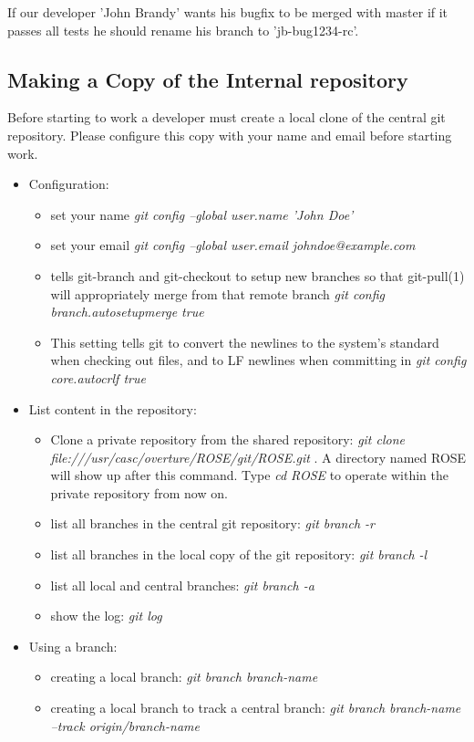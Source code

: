If our developer 'John Brandy' wants his bugfix to be merged with master if it passes
all tests he should rename his branch to 'jb-bug1234-rc'.


\subsection{Making a Copy of the Internal repository}



Before starting to work a developer must create a local clone of the central git repository.
Please configure this copy with your name and email before starting work.

\begin{itemize}

\item Configuration:
  \begin{itemize}
          \item set your name \textit{git config --global user.name 'John Doe' }
	  \item set your email \textit{git config --global user.email johndoe@example.com}
	  \item tells git-branch and git-checkout to setup new branches so that git-pull(1)
    will appropriately merge from that remote branch \textit{git config branch.autosetupmerge true}
          \item This setting tells git to convert the newlines to the system’s standard
	    when checking out files, and to LF newlines when committing in \textit{git config core.autocrlf true}
   \end{itemize}       
\item List content in the repository:
  \begin{itemize}
          \item Clone a private repository from the shared repository: \textit{git clone 
          file:///usr/casc/overture/ROSE/git/ROSE.git} . A directory named ROSE will show up after this 
           command. Type \textit{cd ROSE} to operate within the private repository from now on.
          \item list all branches in the central git repository: \textit{git branch -r}
          \item list all branches in the local copy of the git repository: \textit{git branch -l}
          \item list all local and central branches: \textit{git branch -a}

          \item show the log: \textit{git log} 
   \end{itemize}       
\item Using a branch:
   \begin{itemize}
          \item creating a local branch: \textit{git branch branch-name} 
          \item creating a local branch to track a central branch: \textit{git branch branch-name --track origin/branch-name} 


\end{itemize}
\end{itemize}
